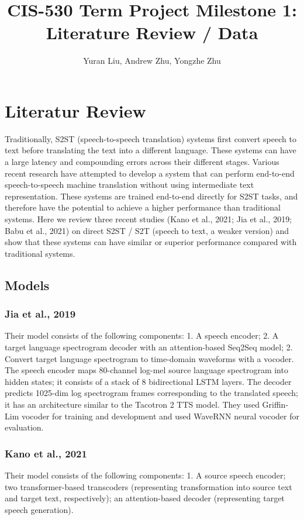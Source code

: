 \documentclass{article}
\title{CIS-530 Term Project Milestone 1: Literature Review / Data}
\author{Yuran Liu, Andrew Zhu, Yongzhe Zhu}
\begin{document}
\maketitle

\section{Literatur Review}
Traditionally, S2ST (speech-to-speech translation) systems first convert speech to text before translating the text into a different language. These systems can have a large latency and compounding errors across their different stages. Various recent research have attempted to develop a system that can perform end-to-end speech-to-speech machine translation without using intermediate text representation. These systems are trained end-to-end directly for S2ST tasks, and therefore have the potential to achieve a higher performance than traditional systems. Here we review three recent studies (Kano et al., 2021; Jia et al., 2019; Babu et al., 2021) on direct S2ST / S2T (speech to text, a weaker version) and show that these systems can have similar or superior performance compared with traditional systems.
\subsection{Models}
\subsubsection{Jia et al., 2019}
Their model consists of the following components: 1. A speech encoder; 2. A target language spectrogram decoder with an attention-based Seq2Seq model; 2. Convert target language spectrogram to time-domain waveforms with a vocoder. The speech encoder maps 80-channel log-mel source language spectrogram into hidden states; it consists of a stack of 8 bidirectional LSTM layers. The decoder predicts 1025-dim log spectrogram frames corresponding to the translated speech; it has an architecture similar to the Tacotron 2 TTS model. They used Griffin-Lim vocoder for training and development and used WaveRNN neural vocoder for evaluation.
\subsubsection{Kano et al., 2021}
Their model consists of the following components: 1. A source speech encoder; two transformer-based transcoders (representing transformation into source text and target text, respectively); an attention-based decoder (representing target speech generation).
\end{document}
